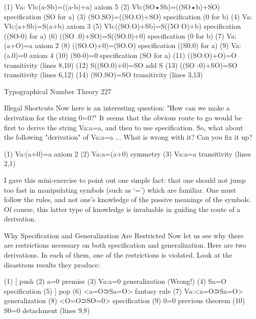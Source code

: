 (1)    Va: Vb:(a-Sb)=((a-b)+a)                      axiom 5
(2)    Vb:(SO•Sb)=((SO•b)+SO)                       specification (SO for a)
(3)    (SO.SO)=((SO.O)+SO)                          specification (0 for b)
(4)    Va: Vb:(a+Sb)=S(a+b)                                 axiom 3
(5)    Vb:((SO.O)+Sb)=S((5O O)+b)                   specification ((SO-0) for a)
(6)    ((SO .0)+SO)=S((SO.0)+0)                     specification (0 for b)
(7)    Va:(a+O)=a                                   axiom 2
(8)    ((SO.O)+0)=(SO.O)                            specification ((S0.0) for a)
(9)    Va:(a.0)=0                                   axiom 4
(10)   (S0-0)=0                                     specification (SO for a)
(11)   ((SO.O)+O)=O                                 transitivity (lines 8,10)
(12)   S((SO.0)+0)=SO                               add S
(13)   ((SO -0)+SO)=SO                              transitivity (lines 6,12)
(14)   (SO.SO)=SO                                   transitivity (lines 3,13)


Typographical Number Theory                                                           227

                                     Illegal Shortcuts
Now here is an interesting question: "How can we make a derivation for the string 0=0?"
It seems that the obvious route to go would be first to derive the string Va:a=a, and then
to use specification. So, what about the following "derivation" of Va:a=a ... What is
wrong with it? Can you fix it up?

       (1)     Va:(a+0)=a              axiom 2
       (2)     Va:a=(a+0)              symmetry
       (3)     Va:a=a                  transitivity (lines 2,1)

I gave this mini-exercise to point out one simple fact: that one should not jump too fast in
manipulating symbols (such as `=') which are familiar. One must follow the rules, and not
one's knowledge of the passive meanings of the symbols. Of course, this latter type of
knowledge is invaluable in guiding the route of a derivation.

             Why Specification and Generalization Are Restricted
Now let us see why there are restrictions necessary on both specification and
generalization. Here are two derivations. In each of them, one of the restrictions is
violated. Look at the disastrous results they produce:

(1)    [                               push
(2)        a=0                         premise
(3)        Va:a=0                      generalization (Wrong!)
(4)        Sa=O                        specification
(5)    ]                               pop
(6)    <a=O⊃Sa=O>                              fantasy rule
(7)    Va:<a=O⊃Sa=O>                   generalization
(8)    <O=O⊃SO=0>                      specification
(9)    0=0                             previous theorem
(10)   S0=0                            detachment (lines 9,8)

